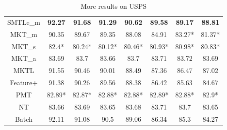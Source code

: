 \begin{table*}
{{\begin{tabular}{|c|c|c|c|c|c|c|c|}
      SMTLe\_m & \textbf{92.27} & \textbf{91.68} & \textbf{91.29} & \textbf{90.62} & \textbf{89.58} & \textbf{89.17} & \textbf{88.81}\\ 
      MKT\_{m} & 90.35 & 89.67 & 89.35 & 88.08 & 84.91 & 83.27* & 81.37*\\ 
      MKT\_{s} & 82.4* & 80.24* & 80.12* & 80.46* & 80.93* & 80.98* & 80.83*\\ 
      MKT\_{a} & 83.69 & 83.7 & 83.66 & 83.7 & 83.71 & 83.72 & 83.69\\ 
      MKTL & 91.55 & 90.46 & 90.01 & 88.49 & 87.36 & 86.47 & 87.02\\ 
      Feature+ & 91.38 & 90.26 & 89.56 & 88.38 & 86.42 & 85.63 & 84.67\\ 
      PMT & 82.89* & 82.87* & 82.88* & 82.88* & 82.89* & 82.88* & 82.9*\\ 
      NT & 83.66 & 83.69 & 83.65 & 83.68 & 83.71 & 83.7 & 83.65\\ 
      Batch & 92.11 & 91.08 & 90.5 & 89.06 & 86.34 & 85.3 & 84.27\\ 
\hline\end{tabular}}}\caption{More results on USPS} \label{tab:usps}
\end{table*}